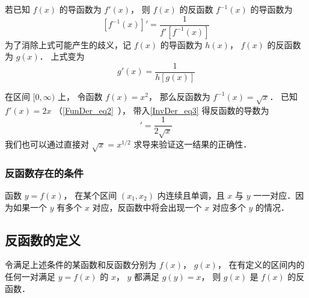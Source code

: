 

若已知 $f(x)$ 的导函数为 $f'(x)$， 则 $f(x)$ 的反函数 $f^{-1}(x)$ 的导函数为
\begin{equation}\label{InvDer_eq3}
[f^{-1}(x)]' = \frac{1}{f'[f^{-1}(x)]} 
\end{equation} 
为了消除上式可能产生的歧义，记 $f(x)$ 的导函数为 $h(x)$，  $f(x)$ 的反函数为 $g(x)$． 上式变为
 \begin{equation}
g'(x) = \frac{1}{h[g(x)]}
\end{equation}

\begin{example}{}
在区间 $[0, \infty)$ 上， 令函数 $f(x) = x^2$， 那么反函数为 $f^{-1}(x) = \sqrt{x}$． 已知 $f'(x) = 2x$ （\autoref{FunDer_eq2}~）， 带入\autoref{InvDer_eq3} 得反函数的导数为
\begin{equation}
[f^{-1}(x)]' = \frac{1}{2\sqrt{x}} 
\end{equation}
我们也可以通过直接对 $\sqrt{x} = x^{1/2}$ 求导来验证这一结果的正确性．
\end{example}

\subsubsection{反函数存在的条件}
函数 $y = f(x)$， 在某个区间 $(x_1, x_2)$ 内连续且单调，且 $x$ 与 $y$ 一一对应．因为如果一个 $y$ 有多个 $x$ 对应，反函数中将会出现一个 $x$ 对应多个 $y$ 的情况．

\subsection{反函数的定义}
令满足上述条件的某函数和反函数分别为 $f(x)$，  $g(x)$， 在有定义的区间内的任何一对满足 $y = f(x)$ 的 $x$，  $y$ 都满足 $g(y) = x$， 则 $g(x)$ 是 $f(x)$ 的反函数．

